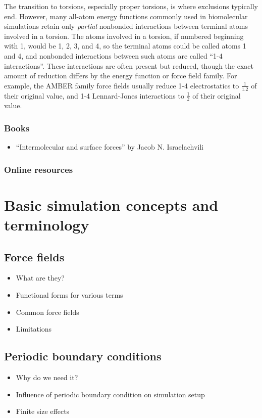 \documentclass[9pt,bestpractices]{livecoms}
\begin{document}
The transition to torsions, especially proper torsions, is where exclusions
typically end.  However, many all-atom energy functions commonly used in
biomolecular simulations retain only \emph{partial} nonbonded
interactions between terminal atoms involved in a torsion.  The atoms
involved in a torsion, if numbered beginning with 1, would be 1, 2, 3,
and 4, so the terminal atoms could be called atoms 1 and 4, and
nonbonded interactions between such atoms are called ``1-4
interactions''.  These interactions are often present but reduced,
though the exact amount of reduction differs by the energy function or
force field family.  For example, the AMBER family force fields usually
reduce 1-4 electrostatics to $\frac{1}{1.2}$ of their original value,
and 1-4 Lennard-Jones interactions to $\frac{1}{2}$ of their original
value.


\subsubsection{Books}
\begin{itemize}
\item ``Intermolecular and surface forces'' by Jacob N. Israelachvili
\end{itemize}
\subsubsection{Online resources}

\section{Basic simulation concepts and terminology}

\subsection{Force fields}
\begin{itemize}
\item What are they?
\item Functional forms for various terms
\item Common force fields
\item Limitations
\end{itemize}

\subsection{Periodic boundary conditions}
\label{sec:periodic}
\begin{itemize}
\item Why do we need it?
\item Influence of periodic boundary condition on simulation setup
\item Finite size effects
\end{itemize}
\end{document}
